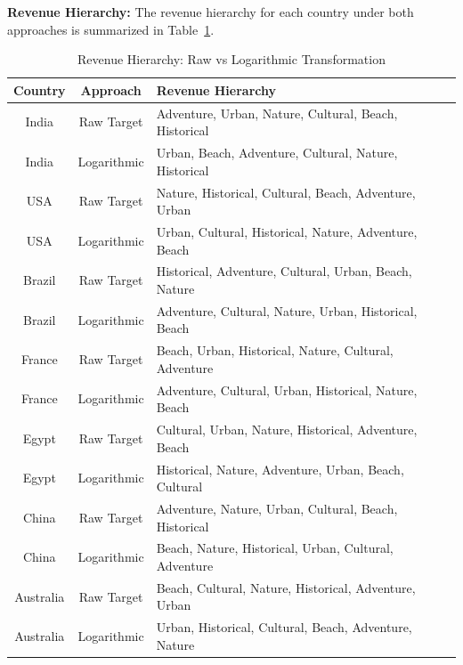 \documentclass{article}
\begin{document}
\textbf{Revenue Hierarchy:}
The revenue hierarchy for each country under both approaches is summarized in Table~\ref{tab:revenue_hierarchy}.

\begin{table}[H]
\centering
\begin{tabular}{|c|c|l|}
\hline
\textbf{Country} & \textbf{Approach} & \textbf{Revenue Hierarchy} \\ \hline
India & Raw Target & Adventure, Urban, Nature, Cultural, Beach, Historical \\ 
India & Logarithmic & Urban, Beach, Adventure, Cultural, Nature, Historical \\ \hline
USA & Raw Target & Nature, Historical, Cultural, Beach, Adventure, Urban \\ 
USA & Logarithmic & Urban, Cultural, Historical, Nature, Adventure, Beach \\ \hline
Brazil & Raw Target & Historical, Adventure, Cultural, Urban, Beach, Nature \\ 
Brazil & Logarithmic & Adventure, Cultural, Nature, Urban, Historical, Beach \\ \hline
France & Raw Target & Beach, Urban, Historical, Nature, Cultural, Adventure \\ 
France & Logarithmic & Adventure, Cultural, Urban, Historical, Nature, Beach \\ \hline
Egypt & Raw Target & Cultural, Urban, Nature, Historical, Adventure, Beach \\ 
Egypt & Logarithmic & Historical, Nature, Adventure, Urban, Beach, Cultural \\ \hline
China & Raw Target & Adventure, Nature, Urban, Cultural, Beach, Historical \\ 
China & Logarithmic & Beach, Nature, Historical, Urban, Cultural, Adventure \\ \hline
Australia & Raw Target & Beach, Cultural, Nature, Historical, Adventure, Urban \\ 
Australia & Logarithmic & Urban, Historical, Cultural, Beach, Adventure, Nature \\ \hline
\end{tabular}
\caption{Revenue Hierarchy: Raw vs Logarithmic Transformation}
\label{tab:revenue_hierarchy}
\end{table}
\end{document}
